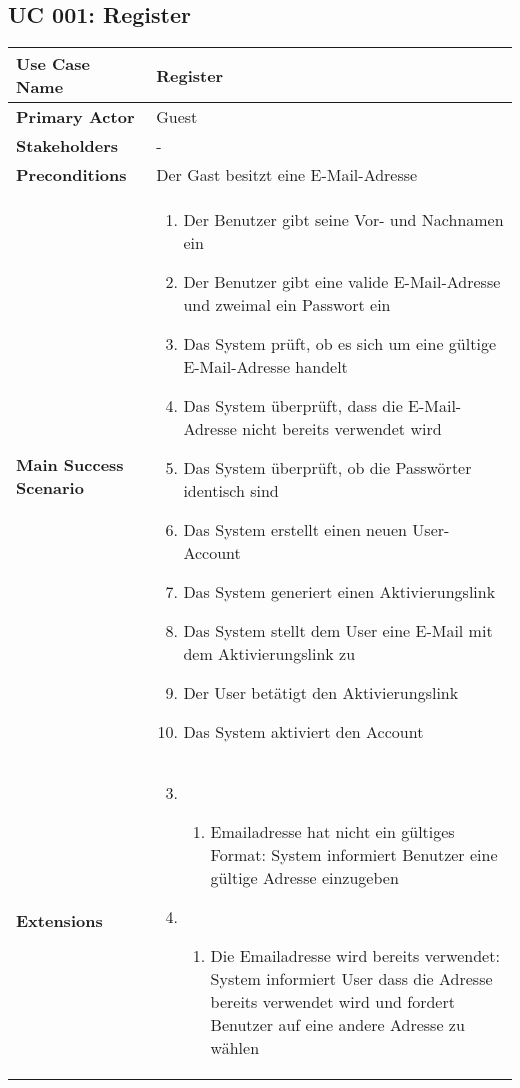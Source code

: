 \subsection{UC 001: Register}
\label{uc:001-register}

\begin{tabular}{|l|p{}|}
\hline
\textbf{Use Case Name} 	&	Register	\\ \hline
\textbf{Primary Actor} 	&	Guest	\\ \hline
\textbf{Stakeholders}	&	-	\\ \hline
\textbf{Preconditions}	&	Der Gast besitzt eine E-Mail-Adresse	\\ \hline
\textbf{Main Success Scenario}	& 	
\begin{enumerate}
	\item Der Benutzer gibt seine Vor- und Nachnamen ein
	\item Der Benutzer gibt eine valide E-Mail-Adresse und zweimal ein Passwort ein
	\item Das System prüft, ob es sich um eine gültige E-Mail-Adresse handelt
	\item Das System überprüft, dass die E-Mail-Adresse nicht bereits verwendet wird
	\item Das System überprüft, ob die Passwörter identisch sind
	\item Das System erstellt einen neuen User-Account
	\item Das System generiert einen Aktivierungslink 
	\item Das System stellt dem User eine E-Mail mit dem Aktivierungslink zu
	\item Der User betätigt den Aktivierungslink 
	\item Das System aktiviert den Account 
\end{enumerate}
\\ \hline
\textbf{Extensions}	& 	
\begin{enumerate}
\setcounter{enumi}{2}
\item 
\begin{enumerate}
\item Emailadresse hat nicht ein gültiges Format: System informiert Benutzer eine gültige Adresse einzugeben
\end{enumerate}
\item
\begin{enumerate}
\item Die Emailadresse wird bereits verwendet: System informiert User dass die Adresse bereits verwendet wird und fordert Benutzer auf eine andere Adresse zu wählen

\end{enumerate}
\end{enumerate}
\end{tabular}
